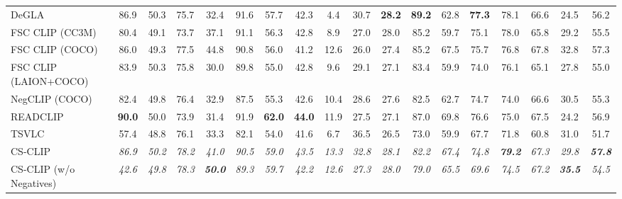 \begin{table}[t]
\begin{adjustbox}{max width=\textwidth}
\begin{tabular}{lccccccccccccccccc}
    DeGLA & 86.9 & 50.3 & 75.7 & 32.4 & 91.6 & 57.7 & 42.3 & 4.4 & 30.7 & \textbf{28.2} & \textbf{89.2} & 62.8 & \textbf{77.3} & 78.1 & 66.6 & 24.5 & 56.2 \\
    FSC CLIP (CC3M) & 80.4 & 49.1 & 73.7 & 37.1 & 91.1 & 56.3 & 42.8 & 8.9 & 27.0 & 28.0 & 85.2 & 59.7 & 75.1 & 78.0 & 65.8 & 29.2 & 55.5 \\
    FSC CLIP (COCO) & 86.0 & 49.3 & 77.5 & 44.8 & 90.8 & 56.0 & 41.2 & 12.6 & 26.0 & 27.4 & 85.2 & 67.5 & 75.7 & 76.8 & 67.8 & 32.8 & 57.3 \\
    FSC CLIP (LAION+COCO) & 83.9 & 50.3 & 75.8 & 30.0 & 89.8 & 55.0 & 42.8 & 9.6 & 29.1 & 27.1 & 83.4 & 59.9 & 74.0 & 76.1 & 65.1 & 27.8 & 55.0 \\
    NegCLIP (COCO) & 82.4 & 49.8 & 76.4 & 32.9 & 87.5 & 55.3 & 42.6 & 10.4 & 28.6 & 27.6 & 82.5 & 62.7 & 74.7 & 74.0 & 66.6 & 30.5 & 55.3 \\
    READCLIP & \textbf{90.0} & 50.0 & 73.9 & 31.4 & 91.9 & \textbf{62.0} & \textbf{44.0} & 11.9 & 27.5 & 27.1 & 87.0 & 69.8 & 76.6 & 75.0 & 67.5 & 24.2 & 56.9 \\
    TSVLC & 57.4 & 48.8 & 76.1 & 33.3 & 82.1 & 54.0 & 41.6 & 6.7 & 36.5 & 26.5 & 73.0 & 59.9 & 67.7 & 71.8 & 60.8 & 31.0 & 51.7 \\
    \midrule
    CS-CLIP & \emph{86.9} & \emph{50.2} & \emph{78.2} & \emph{41.0} & \emph{90.5} & \emph{59.0} & \emph{43.5} & \emph{13.3} & \emph{32.8} & \emph{28.1} & \emph{82.2} & \emph{67.4} & \emph{74.8} & \emph{\textbf{79.2}} & \emph{67.3} & \emph{29.8} & \emph{\textbf{57.8}} \\
    CS-CLIP (w/o Negatives) & \emph{42.6} & \emph{49.8} & \emph{78.3} & \emph{\textbf{50.0}} & \emph{89.3} & \emph{59.7} & \emph{42.2} & \emph{12.6} & \emph{27.3} & \emph{28.0} & \emph{79.0} & \emph{65.5} & \emph{69.6} & \emph{74.5} & \emph{67.2} & \emph{\textbf{35.5}} & \emph{54.5} \\
    \bottomrule
  \end{tabular}
  \end{adjustbox}
\end{table}

